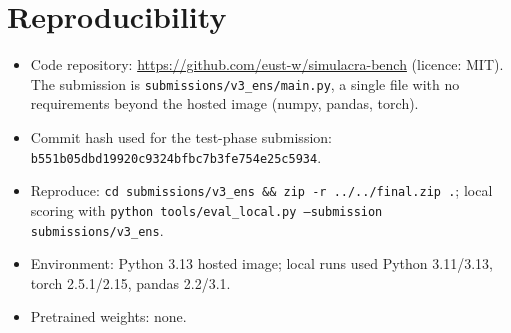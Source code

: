 \documentclass{article}
\begin{document}
\begin{table}[h]
  \centering
  \small
  \caption{Local skill on synthetic sandbox data, phase-1 split (\textsc{train} visible, \textsc{dev} scored). Not leaderboard numbers.}
  \label{tab:sandbox}
\end{table}

\section{Reproducibility}
\label{sec:repro}
\begin{itemize}[leftmargin=*]
  \item Code repository: \url{https://github.com/eust-w/simulacra-bench} (licence: MIT). The submission is \texttt{submissions/v3\_ens/main.py}, a single file with no requirements beyond the hosted image (numpy, pandas, torch).
  \item Commit hash used for the test-phase submission: \texttt{b551b05dbd19920c9324bfbc7b3fe754e25c5934}.
  \item Reproduce: \texttt{cd submissions/v3\_ens \&\& zip -r ../../final.zip .}; local scoring with \texttt{python tools/eval\_local.py --submission submissions/v3\_ens}.
  \item Environment: Python 3.13 hosted image; local runs used Python 3.11/3.13, torch 2.5.1/2.15, pandas 2.2/3.1.
  \item Pretrained weights: none.
\end{itemize}
\end{document}
